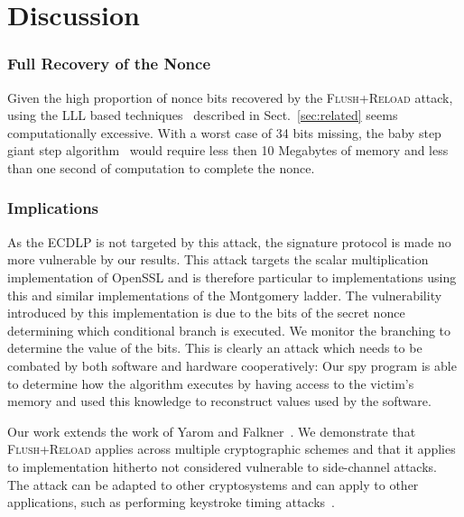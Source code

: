 \documentclass[twocolumn]{svjour3}
\begin{document}
\section{Discussion}\label{sec:discussion}

\subsubsection*{Full Recovery of the Nonce}\label{sub:full_nonce}
Given the high proportion of nonce bits recovered by the \textsc{Flush+Reload} attack, using the LLL based techniques~\cite{Howgrave-GrahamS01,nguyen03insecurity} described in Sect.~\ref{sec:related} seems computationally excessive. 
With a worst case of 34 bits missing, the baby step giant step algorithm~\cite{shanks71class} would require less then 10 Megabytes of memory and less than one second of computation to complete the nonce.


\subsubsection*{Implications}

As the \textsc{ECDLP} is not targeted by this attack, the signature protocol is made no more vulnerable by our results. 
This attack targets the scalar multiplication implementation of OpenSSL and is therefore particular to implementations using this and similar implementations of the Montgomery ladder. The vulnerability introduced by this implementation is due to the bits of the secret nonce determining which conditional branch is executed. We monitor the branching to determine the value of the bits. This is clearly an attack which needs to be combated by both software and hardware cooperatively: Our spy program is able to determine how the algorithm executes by having access to the victim's memory and used this knowledge to reconstruct values used by the software.

Our work extends the work of Yarom and Falkner~\cite{yarom13flush}.
We demonstrate that \textsc{Flush+Reload} applies across multiple cryptographic schemes and that it applies
to implementation hitherto not considered vulnerable to side-channel attacks.
The attack can be adapted to other cryptosystems and can apply to other applications, such as performing keystroke timing attacks~\cite{song01timing,ristenpart09hey}.
\end{document}
